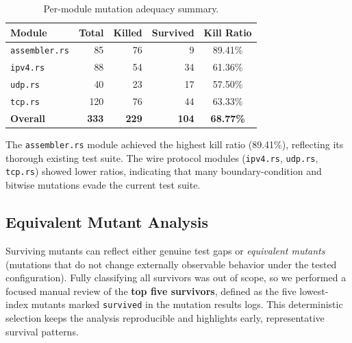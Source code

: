 \documentclass[11pt,a4paper]{article}
\begin{document}
\begin{table}[H]
\centering
\caption{Per-module mutation adequacy summary.}
\label{tab:mutation}
\begin{tabular}{lrrrc}
\toprule
\textbf{Module} & \textbf{Total} & \textbf{Killed} & \textbf{Survived} & \textbf{Kill Ratio} \\
\midrule
\texttt{assembler.rs} & 85  & 76 & 9  & 89.41\% \\
\texttt{ipv4.rs}      & 88  & 54 & 34 & 61.36\% \\
\texttt{udp.rs}       & 40  & 23 & 17 & 57.50\% \\
\texttt{tcp.rs}       & 120 & 76 & 44 & 63.33\% \\
\midrule
\textbf{Overall}      & \textbf{333} & \textbf{229} & \textbf{104} & \textbf{68.77\%} \\
\bottomrule
\end{tabular}
\end{table}

The \texttt{assembler.rs} module achieved the highest kill ratio (89.41\%), reflecting its thorough existing test suite. The wire protocol modules (\texttt{ipv4.rs}, \texttt{udp.rs}, \texttt{tcp.rs}) showed lower ratios, indicating that many boundary-condition and bitwise mutations evade the current test suite.

\subsection{Equivalent Mutant Analysis}

Surviving mutants can reflect either genuine test gaps or \emph{equivalent mutants} (mutations that do not change externally observable behavior under the tested configuration). Fully classifying all survivors was out of scope, so we performed a focused manual review of the \textbf{top five survivors}, defined as the five lowest-index mutants marked \texttt{survived} in the mutation results logs. This deterministic selection keeps the analysis reproducible and highlights early, representative survival patterns.
\end{document}
